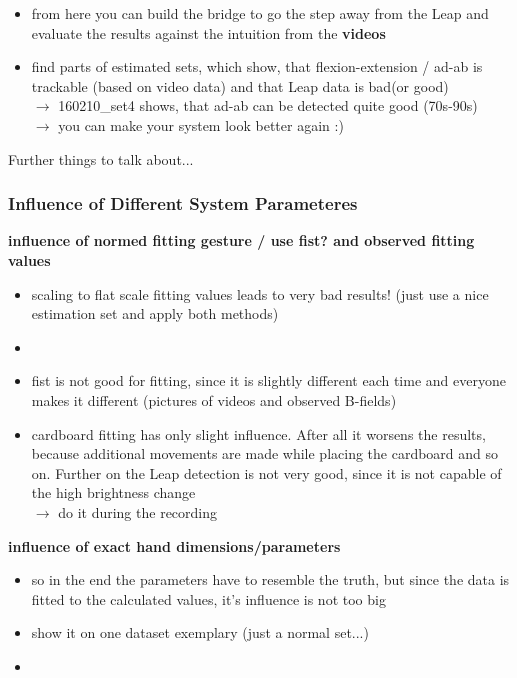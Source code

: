 \begin{itemize}
	\item from here you can build the bridge to go the step away from the Leap and evaluate the results against the intuition from the \textbf{videos}
	\item find parts of estimated sets, which show, that flexion-extension / ad-ab is trackable (based on video data) and that Leap data is bad(or good) \\
		$ \rightarrow $ 160210\_set4 shows, that ad-ab can be detected quite good (70s-90s)	\\
		$ \rightarrow $	you can make your system look better again :)  
	\end{itemize}
	

	
	
Further things to talk about... \\
\subsubsection{Influence of Different System Parameteres}

\textbf{influence of normed fitting gesture / use fist? and observed fitting values}
	\begin{itemize}
	\item scaling to flat scale fitting values leads to very bad results! (just use a nice estimation set and apply both methods)
	\item {}
	\item fist is not good for fitting, since it is slightly different each time and everyone makes it different (pictures of videos and observed B-fields)
	\item cardboard fitting has only slight influence. After all it worsens the results, because additional movements are made while placing the cardboard and so on. Further on the Leap detection is not very good, since it is not capable of the high brightness change\\
	$ \rightarrow $ do it during the recording
	 
	\end{itemize}


\textbf{influence of exact hand dimensions/parameters}
	\begin{itemize}
	\item so in the end the parameters have to resemble the truth, but since the data is fitted to the calculated values, it's influence is not too big
	\item show it on one dataset exemplary (just a normal set...)
	\item {}
	\end{itemize}

